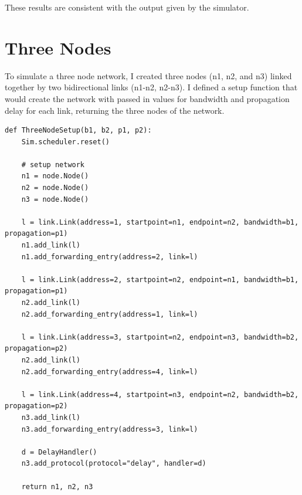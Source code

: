 \documentclass[11pt]{article}
\begin{document}
\begin{enumerate}
\begin{description}
These results are consistent with the output given by the simulator.
\end{description}

\end{enumerate}

\section{Three Nodes}

To simulate a three node network, I created three nodes (n1, n2, and n3) linked together by two bidirectional links (n1-n2, n2-n3). I defined a setup function that would create the network with passed in values for bandwidth and propagation delay for each link, returning the three nodes of the network.

\vspace{0.5cm}
\begin{lstlisting}
def ThreeNodeSetup(b1, b2, p1, p2):
    Sim.scheduler.reset()

    # setup network
    n1 = node.Node()
    n2 = node.Node()
    n3 = node.Node()
    
    l = link.Link(address=1, startpoint=n1, endpoint=n2, bandwidth=b1, propagation=p1)
    n1.add_link(l)
    n1.add_forwarding_entry(address=2, link=l)
    
    l = link.Link(address=2, startpoint=n2, endpoint=n1, bandwidth=b1, propagation=p1)
    n2.add_link(l)
    n2.add_forwarding_entry(address=1, link=l)

    l = link.Link(address=3, startpoint=n2, endpoint=n3, bandwidth=b2, propagation=p2)
    n2.add_link(l)
    n2.add_forwarding_entry(address=4, link=l)
    
    l = link.Link(address=4, startpoint=n3, endpoint=n2, bandwidth=b2, propagation=p2)
    n3.add_link(l)
    n3.add_forwarding_entry(address=3, link=l)

    d = DelayHandler()
    n3.add_protocol(protocol="delay", handler=d)

    return n1, n2, n3
\end{lstlisting}
\end{document}
